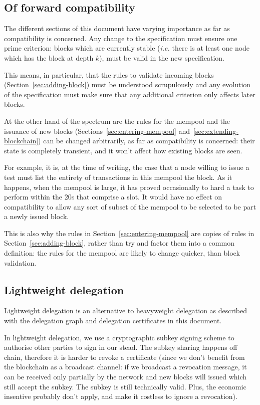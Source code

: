 \documentclass{article}
\begin{document}
\subsection{Of forward compatibility}
\label{sec:forward-comp}

The different sections of this document have varying importance as far
as compatibility is concerned. Any change to the specification must
ensure one prime criterion: blocks which are currently stable
(\emph{i.e.} there is at least one node which has the block at depth
$k$), must be valid in the new specification.

This means, in particular, that the rules to validate incoming blocks
(Section~\ref{sec:adding-block}) must be understood scrupulously and
any evolution of the specification must make sure that any additional
criterion only affects later blocks.

At the other hand of the spectrum are the rules for the mempool and
the issuance of new blocks (Sections~\ref{sec:entering-mempool}
and~\ref{sec:extending-blockchain}) can be changed arbitrarily, as far
as compatibility is concerned: their state is completely transient,
and it won't affect how existing blocks are seen.

For example, it is, at the time of writing, the case that a node
willing to issue a test must list the entirety of transactions in this
mempool the block. As it happens, when the mempool is large, it has
proved occasionally to hard a task to perform within the 20s that
comprise a slot. It would have no effect on compatibility to allow any
sort of subset of the mempool to be selected to be part a newly issued
block.

This is also why the rules in Section~\ref{sec:entering-mempool} are
copies of rules in Section~\ref{sec:adding-block}, rather than try and
factor them into a common definition: the rules for the mempool are
likely to change quicker, than block validation.

\subsection{Lightweight delegation}
\label{sec:lightweight-delegation}

Lightweight delegation is an alternative to heavyweight delegation as
described with the delegation graph and delegation certificates in
this document.

In lightweight delegation, we use a cryptographic subkey signing
scheme to authorise other parties to sign in our stead. The subkey
sharing happens off chain, therefore it is harder to revoke a
certificate (since we don't benefit from the blockchain as a broadcast
channel: if we broadcast a revocation message, it can be received only
partially by the network and new blocks will issued which still accept
the subkey. The subkey is still technically valid. Plus, the economic
insentive probably don't apply, and make it costless to ignore a
revocation).
\end{document}
